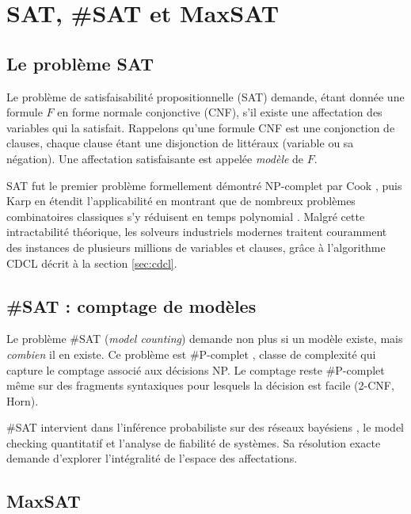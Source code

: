 \documentclass[11pt,a4paper]{report}
\theoremstyle{plain}
\theoremstyle{definition}
\begin{document}
\section{SAT, \#SAT et MaxSAT}

\subsection{Le problème SAT}

Le problème de satisfaisabilité propositionnelle (SAT) demande, étant donnée
une formule $F$ en forme normale conjonctive (CNF), s'il existe une
affectation des variables qui la satisfait. Rappelons qu'une formule CNF est
une conjonction de clauses, chaque clause étant une disjonction de littéraux
(variable ou sa négation). Une affectation satisfaisante est appelée
\emph{modèle} de $F$.

SAT fut le premier problème formellement démontré NP-complet par Cook
\cite{cook1971}, puis Karp en étendit l'applicabilité en montrant que de
nombreux problèmes combinatoires classiques s'y réduisent en temps
polynomial \cite{karp1972}. Malgré cette intractabilité théorique, les
solveurs industriels modernes traitent couramment des instances de plusieurs
millions de variables et clauses, grâce à l'algorithme
CDCL \cite{moskewicz2001,een2003} décrit à la section \ref{sec:cdcl}.

\subsection{\#SAT : comptage de modèles}

Le problème \#SAT (\emph{model counting}) demande non plus si un modèle
existe, mais \emph{combien} il en existe. Ce problème est \#P-complet
\cite{valiant1979}, classe de complexité qui capture le comptage associé
aux décisions NP. Le comptage reste \#P-complet même sur des fragments
syntaxiques pour lesquels la décision est facile (2-CNF, Horn).

\#SAT intervient dans l'inférence probabiliste sur des réseaux bayésiens
\cite{darwiche2002}, le model checking quantitatif et l'analyse de fiabilité
de systèmes. Sa résolution exacte demande d'explorer l'intégralité de
l'espace des affectations.

\subsection{MaxSAT}
\end{document}
